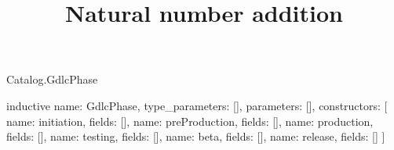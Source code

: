 \begin{lexlean}{Catalog.GdlcPhase}
\title{Natural number addition}
\begin{semanticmodule}
inductive{
  name: GdlcPhase,
  type_parameters: [],
  parameters: [],
  constructors: [
    {name: initiation, fields: []},
    {name: preProduction, fields: []},
    {name: production, fields: []},
    {name: testing, fields: []},
    {name: beta, fields: []},
    {name: release, fields: []}
  ]
}
\end{semanticmodule}
\end{lexlean}
